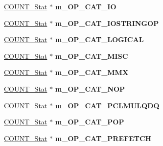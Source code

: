 \begin{DoxyCompactItemize}
\item 
\hypertarget{classall__stats__c_add22a9798a48b866f4026d520e8f6e1d}{
\hyperlink{classCOUNT__Stat}{COUNT\_\-Stat} $\ast$ {\bfseries m\_\-OP\_\-CAT\_\-IO}}
\label{classall__stats__c_add22a9798a48b866f4026d520e8f6e1d}

\item 
\hypertarget{classall__stats__c_ad0e7c1c71e18f97d3d03c5255722758a}{
\hyperlink{classCOUNT__Stat}{COUNT\_\-Stat} $\ast$ {\bfseries m\_\-OP\_\-CAT\_\-IOSTRINGOP}}
\label{classall__stats__c_ad0e7c1c71e18f97d3d03c5255722758a}

\item 
\hypertarget{classall__stats__c_abecf57d4d22b09fedfcf3e665dea06ed}{
\hyperlink{classCOUNT__Stat}{COUNT\_\-Stat} $\ast$ {\bfseries m\_\-OP\_\-CAT\_\-LOGICAL}}
\label{classall__stats__c_abecf57d4d22b09fedfcf3e665dea06ed}

\item 
\hypertarget{classall__stats__c_a3d21badf9ac8d6da99eaadb01116486d}{
\hyperlink{classCOUNT__Stat}{COUNT\_\-Stat} $\ast$ {\bfseries m\_\-OP\_\-CAT\_\-MISC}}
\label{classall__stats__c_a3d21badf9ac8d6da99eaadb01116486d}

\item 
\hypertarget{classall__stats__c_a6278849115f72425ec674afad09df495}{
\hyperlink{classCOUNT__Stat}{COUNT\_\-Stat} $\ast$ {\bfseries m\_\-OP\_\-CAT\_\-MMX}}
\label{classall__stats__c_a6278849115f72425ec674afad09df495}

\item 
\hypertarget{classall__stats__c_ad1be9bd2aed5b9f0cb72029e06305c2b}{
\hyperlink{classCOUNT__Stat}{COUNT\_\-Stat} $\ast$ {\bfseries m\_\-OP\_\-CAT\_\-NOP}}
\label{classall__stats__c_ad1be9bd2aed5b9f0cb72029e06305c2b}

\item 
\hypertarget{classall__stats__c_a0b571979add49381e1b7f04cc94433d0}{
\hyperlink{classCOUNT__Stat}{COUNT\_\-Stat} $\ast$ {\bfseries m\_\-OP\_\-CAT\_\-PCLMULQDQ}}
\label{classall__stats__c_a0b571979add49381e1b7f04cc94433d0}

\item 
\hypertarget{classall__stats__c_acd37daa8da32a3bcd26e942d541188d0}{
\hyperlink{classCOUNT__Stat}{COUNT\_\-Stat} $\ast$ {\bfseries m\_\-OP\_\-CAT\_\-POP}}
\label{classall__stats__c_acd37daa8da32a3bcd26e942d541188d0}

\item 
\hypertarget{classall__stats__c_acd8f523de36d7ec6ecf9948319582eb2}{
\hyperlink{classCOUNT__Stat}{COUNT\_\-Stat} $\ast$ {\bfseries m\_\-OP\_\-CAT\_\-PREFETCH}}
\label{classall__stats__c_acd8f523de36d7ec6ecf9948319582eb2}


\end{DoxyCompactItemize}
